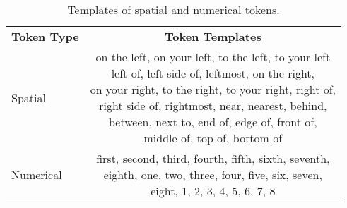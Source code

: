 \begin{table}[h]
\begin{adjustbox}{width=\linewidth,center}
\begin{tabular}{l c }
\cmidrule[\heavyrulewidth]{1-2}
\textbf{Token Type} & \textbf{Token Templates} \\ \cmidrule[\heavyrulewidth]{1-2}
Spatial     & \makecell[l]{
on the left, on your left, to the left, to your left \\
left of, left side of, leftmost, on the right, \\
on your right, to the right, to your right, right of, \\
right side of, rightmost, near, nearest, behind, \\
between, next to, end of, edge of, front of, \\
middle of, top of, bottom of
}
\\ \cmidrule{1-2}
Numerical     &  \makecell[l]{
first, second, third, fourth, fifth, sixth, seventh, \\
eighth, one, two, three, four, five, six, seven, \\
eight, 1, 2, 3, 4, 5, 6, 7, 8
}
\\ \cmidrule{1-2}
\end{tabular}
\end{adjustbox}
\vspace{-2.5mm}
\caption{Templates of spatial and numerical tokens.}
\label{tab:token}
\vspace{-2.5mm}
\end{table}



